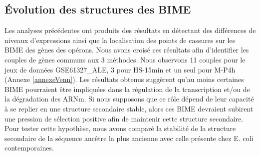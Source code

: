 \documentclass[12pt,a4paper]{report}
\begin{document}
\begin{onehalfspace}
\section*{Évolution des structures des BIME}
Les analyses précédentes ont produits des résultats en détectant des différences de niveaux d'expressions ainsi que la localisation des points de cassures sur les BIME des gènes des opérons. Nous avons croisé ces résultats afin d'identifier les couples de gènes communs aux 3 méthodes. Nous observons 11 couples pour le jeux de données GSE61327\_ALE, 3 pour HS-15min et un seul pour M-P4h (Annexe \ref{annexeVenn}).
Les résultats obtenus suggèrent qu’au moins certaines BIME pourraient être impliquées dans la régulation de la transcription et/ou de la dégradation des ARNm. Si nous supposons que ce rôle dépend de leur capacité à se replier en une structure secondaire stable, alors ces BIME devraient subirent une pression de sélection positive afin de maintenir cette structure secondaire. Pour tester cette hypothèse, nous avons comparé la stabilité de la structure secondaire de la séquence ancêtre la plus ancienne avec celle présente chez E. coli contemporaines.


\end{onehalfspace}
\end{document}
